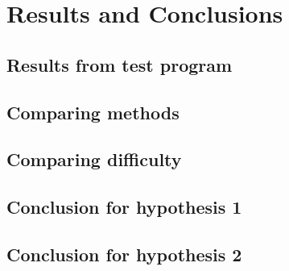 \documentclass[a4paper,11pt]{article}
\begin{document}
\section{Results and Conclusions}
\subsection{Results from test program}
\subsection{Comparing methods}
\subsection{Comparing difficulty}
\subsection{Conclusion for hypothesis 1}
\subsection{Conclusion for hypothesis 2}
\end{document}
